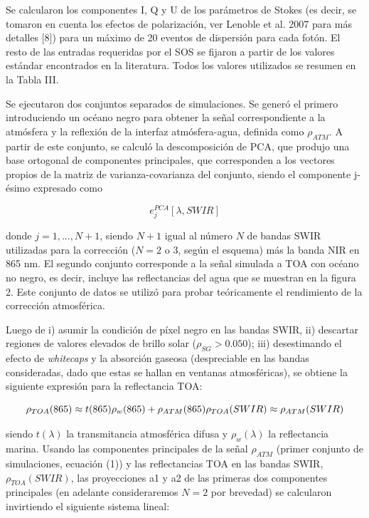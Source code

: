 Se calcularon los componentes I, Q y U de los parámetros de Stokes (es decir, se tomaron en cuenta los efectos de polarización, ver Lenoble et al. 2007 para más detalles [8]) para un máximo de 20 eventos de dispersión para cada fotón. El resto de las entradas requeridas por el SOS se fijaron a partir de los valores estándar encontrados en la literatura. Todos los valores utilizados se resumen en la Tabla III.

Se ejecutaron dos conjuntos separados de simulaciones. Se generó el primero introduciendo un océano negro para obtener la señal correspondiente a la atmósfera y la reflexión de la interfaz atmósfera-agua, definida como $\rho_{ATM}$. A partir de este conjunto, se calculó la descomposición de PCA, que produjo una base ortogonal de componentes principales, que corresponden a los vectores propios de la matriz de varianza-covarianza del conjunto, siendo el componente j-ésimo expresado como

\begin{equation}
e^{PCA}_{j}[\lambda,SWIR]    
\end{equation}

donde $j=1,...,N+1 $, siendo $N+1$ igual al número $N$ de bandas SWIR utilizadas para la corrección ($N=2$ o $3$, según el esquema) más la banda NIR en 865 nm.
El segundo conjunto corresponde a la señal simulada a TOA con océano no negro, es decir, incluye las reflectancias del agua que se muestran en la figura 2. Este conjunto de datos se utilizó para probar teóricamente el rendimiento de la corrección atmosférica.

Luego de i) asumir la condición de píxel negro en las bandas SWIR, ii) descartar regiones de valores elevados de brillo solar ($\rho_{SG}>0.050$); iii) desestimando el efecto de \textit{whitecaps} y la absorción gaseosa (despreciable en las bandas consideradas, dado que estas se hallan en ventanas atmosféricas), se obtiene la siguiente expresión para la reflectancia TOA:

\begin{equation}
\rho_{TOA}(865) \approx t(865)\rho_{w}(865) + \rho_{ATM}(865)
\\
\rho_{TOA}(SWIR) \approx \rho_{ATM}(SWIR)
\end{equation}

siendo $t(\lambda)$ la transmitancia atmosférica difusa y $\rho_{w}(\lambda)$ la reflectancia marina.
Usando las componentes principales de la señal $\rho_{ATM}$ (primer conjunto de simulaciones, ecuación (1)) y las reflectancias TOA en las bandas SWIR, $\rho_{TOA}(SWIR)$, las proyecciones a1 y a2 de las primeras dos componentes principales (en adelante consideraremos $N=2$ por brevedad) se calcularon invirtiendo el siguiente sistema lineal:

